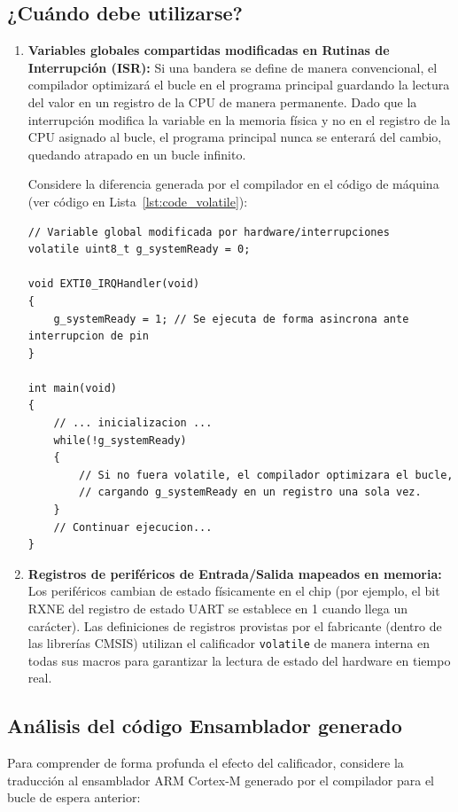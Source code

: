 \documentclass[
10pt, %
a4paper, %
oneside, %
headinclude,footinclude, %
BCOR5mm, %
]{scrartcl}
\begin{document}
\subsection{¿Cuándo debe utilizarse?}
\begin{enumerate}
	\item \textbf{Variables globales compartidas modificadas en Rutinas de Interrupción (ISR):}
	Si una bandera se define de manera convencional, el compilador optimizará el bucle en el programa principal guardando la lectura del valor en un registro de la CPU de manera permanente. Dado que la interrupción modifica la variable en la memoria física y no en el registro de la CPU asignado al bucle, el programa principal nunca se enterará del cambio, quedando atrapado en un bucle infinito.
	
	Considere la diferencia generada por el compilador en el código de máquina (ver código en Lista~\ref{lst:code_volatile}):
	
	\begin{lstlisting}[style=CMakeStyle, caption={Ejemplo de uso de variable volatile.}, label={lst:code_volatile}]
// Variable global modificada por hardware/interrupciones
volatile uint8_t g_systemReady = 0;

void EXTI0_IRQHandler(void)
{
    g_systemReady = 1; // Se ejecuta de forma asincrona ante interrupcion de pin
}

int main(void)
{
    // ... inicializacion ...
    while(!g_systemReady)
    {
        // Si no fuera volatile, el compilador optimizara el bucle,
        // cargando g_systemReady en un registro una sola vez.
    }
    // Continuar ejecucion...
}
	\end{lstlisting}

	\item \textbf{Registros de periféricos de Entrada/Salida mapeados en memoria:} Los periféricos cambian de estado físicamente en el chip (por ejemplo, el bit RXNE del registro de estado UART se establece en 1 cuando llega un carácter). Las definiciones de registros provistas por el fabricante (dentro de las librerías CMSIS) utilizan el calificador \texttt{volatile} de manera interna en todas sus macros para garantizar la lectura de estado del hardware en tiempo real.
\end{enumerate}

\subsection{Análisis del código Ensamblador generado}
Para comprender de forma profunda el efecto del calificador, considere la traducción al ensamblador ARM Cortex-M generado por el compilador para el bucle de espera anterior:
\end{document}

